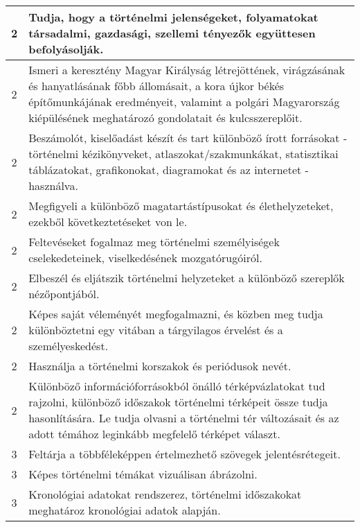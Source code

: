 \begin{longtable}{c | p{} }
                                
                                          2 &  Tudja, hogy a történelmi jelenségeket, folyamatokat társadalmi, gazdasági, szellemi tényezők együttesen befolyásolják. \\ \hline
                                          2 &  Ismeri a keresztény Magyar Királyság létrejöttének, virágzásának és hanyatlásának főbb állomásait, a kora újkor békés építőmunkájának eredményeit, valamint a polgári Magyarország kiépülésének meghatározó gondolatait és kulcsszereplőit. \\ \hline
                                          2 &  Beszámolót, kiselőadást készít és tart különböző írott forrásokat - történelmi kézikönyveket, atlaszokat/szakmunkákat, statisztikai táblázatokat, grafikonokat, diagramokat és az internetet - használva. \\ \hline
                                          2 &  Megfigyeli a különböző magatartástípusokat és élethelyzeteket, ezekből következtetéseket von le. \\ \hline
                                          2 &  Feltevéseket fogalmaz meg történelmi személyiségek cselekedeteinek, viselkedésének mozgatórugóiról. \\ \hline
                                          2 &  Elbeszél és eljátszik történelmi helyzeteket a különböző szereplők nézőpontjából. \\ \hline
                                          2 &  Képes saját véleményét megfogalmazni, és közben meg tudja különböztetni egy vitában a tárgyilagos érvelést és a személyeskedést. \\ \hline
                                          2 &  Használja a történelmi korszakok és periódusok nevét. \\ \hline
                                          2 &  Különböző információforrásokból önálló térképvázlatokat tud rajzolni, különböző időszakok történelmi térképeit össze tudja hasonlítására. Le tudja olvasni a történelmi tér változásait és az adott témához leginkább megfelelő térképet választ. \\ \hline
                                      
                                
                                          3 &  Feltárja a többféleképpen értelmezhető szövegek jelentésrétegeit. \\ \hline
                                          3 &  Képes történelmi témákat vizuálisan ábrázolni. \\ \hline
                                          3 &  Kronológiai adatokat rendszerez, történelmi időszakokat meghatároz kronológiai adatok alapján. \\ \hline
                                      

\end{longtable}
